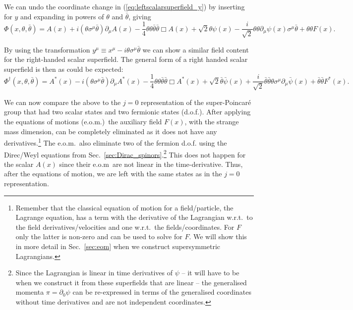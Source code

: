 \documentclass[notes.tex]{subfiles}
\begin{document}
We can undo the coordinate change in (\ref{eq:leftscalarsuperfield_y}) by inserting for $y$ and expanding in powers of $\theta$ and $\bar{\theta}$, giving
\begin{equation}
\Phi(x, \theta, \bar{\theta}) = A(x) + i(\theta\sigma^\mu \bar{\theta})\partial_\mu A(x) - \frac{1}{4}\theta\theta\bar{\theta}\bar{\theta}\Box A(x) + \sqrt{2}\theta \psi(x) - \frac{i}{\sqrt{2}}\theta\theta\partial_\mu \psi(x)\sigma^\mu\bar{\theta} + \theta\theta F(x).
\label{eq:leftscalarsuperfield}
\end{equation}

By using the transformation  $y^\mu \equiv x^\mu - i\theta\sigma^\mu \bar{\theta}$ we can show a similar field content for the right-handed scalar superfield. The general form of a right handed scalar superfield is then as could be expected:
\begin{equation}
\Phi^\dagger (x, \theta, \bar{\theta}) = A^*(x) - i(\theta\sigma^\mu \bar{\theta})\partial_\mu A^*(x) - \frac{1}{4}\theta\theta\bar{\theta}\bar{\theta}\Box A^*(x) + \sqrt{2}\bar{\theta}\bar{\psi}(x) + \frac{i}{\sqrt{2}}\bar{\theta}\bar{\theta}\theta \sigma^\mu\partial_\mu \bar{\psi}(x) +\bar{\theta}\bar{\theta} F^*(x).
\label{eq:rightscalarsuperfield}
\end{equation}

We can now compare the above to the $j=0$ representation of the super-Poincaré group that had two scalar states and two fermionic states (d.o.f.).  After applying the equations of motions (e.o.m.)\ the auxiliary field $F(x)$, with the strange mass dimension, can be completely eliminated as it does not have any derivatives.\footnote{Remember that the classical equation of motion for a field/particle, the Lagrange equation, has a term with the derivative of the Lagrangian w.r.t.\ to the field derivatives/velocities and one w.r.t.\ the fields/coordinates. For $F$ only the latter is non-zero and can be used to solve for $F$. We will show this in more detail in Sec.~\ref{sec:eom} when we construct supersymmetric Lagrangians.} The e.o.m.\ also eliminate two of the fermion d.o.f. using the Direc/Weyl equations from Sec.~\ref{sec:Dirac_spinors}.\footnote{Since the Lagrangian is linear in time derivatives of $\psi$ -- it will have to be  when we construct it from these superfields that are linear -- the generalised momenta $\pi=\partial_0\psi$ can be re-expressed in terms of the generalised coordinates without time derivatives and are not independent coordinates.} 
This does not happen for the scalar $A(x)$ since their e.o.m\ are not linear in the time-derivative. Thus, after the equations of motion, we are left with the same states as in the $j=0$ representation.
\end{document}
